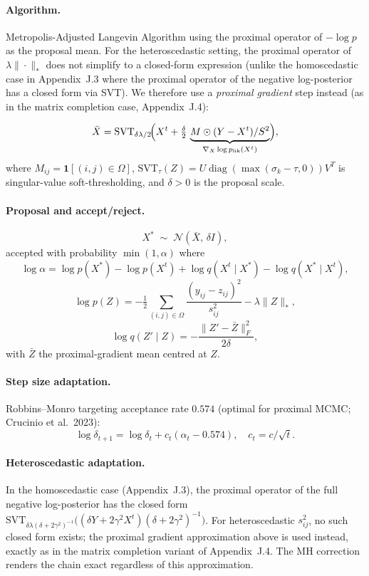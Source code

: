 \paragraph{Algorithm.}
Metropolis-Adjusted Langevin Algorithm using the proximal operator of
$-\log p$ as the proposal mean.  For the heteroscedastic setting, the
proximal operator of $\lambda\|\cdot\|_*$ does not simplify to a closed-form
expression (unlike the homoscedastic case in Appendix~J.3 where the proximal
operator of the negative log-posterior has a closed form via SVT).  We
therefore use a \emph{proximal gradient} step instead (as in the matrix
completion case, Appendix~J.4):

\[
  \bar X = \mathrm{SVT}_{\delta\lambda/2}\!\Bigl(
    X^t + \tfrac{\delta}{2}\, \underbrace{M\odot(Y-X^t)/S^2}_{
      \nabla_X\log p_{\text{lik}}(X^t)}
  \Bigr),
\]
where $M_{ij}=\mathbf{1}[(i,j)\in\Omega]$, $\mathrm{SVT}_\tau(Z)=
U\operatorname{diag}(\max(\sigma_k-\tau,0))V^T$ is singular-value
soft-thresholding, and $\delta>0$ is the proposal scale.

\paragraph{Proposal and accept/reject.}
\[
  X^* \;\sim\; \mathcal{N}(\bar X,\, \delta I),
\]
accepted with probability $\min(1,\alpha)$ where
\[
  \log\alpha
  = \log p(X^*) - \log p(X^t)
  + \log q(X^t\mid X^*) - \log q(X^*\mid X^t),
\]
\[
  \log p(Z)
  = -\tfrac{1}{2}\sum_{(i,j)\in\Omega}\frac{(y_{ij}-z_{ij})^2}{s_{ij}^2}
  - \lambda\|Z\|_*,
\]
\[
  \log q(Z'\mid Z) = -\frac{\|Z'-\bar Z\|_F^2}{2\delta},
\]
with $\bar Z$ the proximal-gradient mean centred at $Z$.

\paragraph{Step size adaptation.}
Robbins--Monro targeting acceptance rate $0.574$ (optimal for proximal MCMC;
Crucinio et al.\ 2023):
\[
  \log\delta_{t+1} = \log\delta_t + c_t(\alpha_t - 0.574),
  \quad c_t = c/\sqrt{t}.
\]

\paragraph{Heteroscedastic adaptation.}
In the homoscedastic case (Appendix~J.3), the proximal operator of the full
negative log-posterior has the closed form
$\mathrm{SVT}_{\delta\lambda(\delta+2\gamma^2)^{-1}}
 \bigl((\delta Y + 2\gamma^2 X^t)(\delta+2\gamma^2)^{-1}\bigr)$.
For heteroscedastic $s_{ij}^2$, no such closed form exists; the proximal
gradient approximation above is used instead, exactly as in the matrix
completion variant of Appendix~J.4.  The MH correction renders the chain
exact regardless of this approximation.


